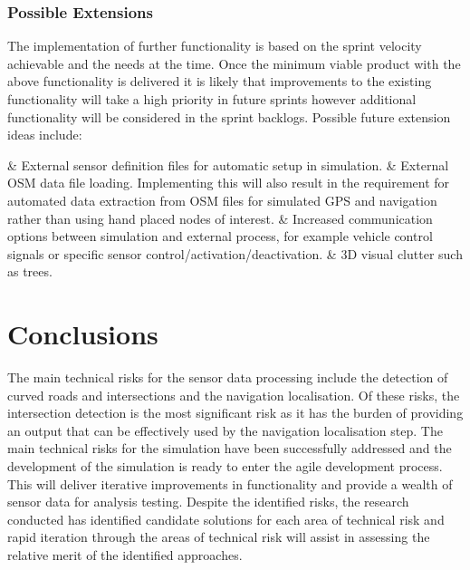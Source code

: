 \documentclass[]{aiaa-tc}%
\begin{document}
\subsubsection{Possible Extensions}

The implementation of further functionality is based on the sprint velocity achievable and the needs at the time. Once the minimum viable product with the above functionality is delivered it is likely that improvements to the existing functionality will take a high priority in future sprints however additional functionality will be considered in the sprint backlogs. Possible future extension ideas include:
\begin{easylist}[itemize]
	& External sensor definition files for automatic setup in simulation.
	& External OSM data file loading. Implementing this will also result in the requirement for automated data extraction from OSM files for simulated GPS and navigation rather than using hand placed nodes of interest.
	& Increased communication options between simulation and external process, for example vehicle control signals or specific sensor control/activation/deactivation.
	& 3D visual clutter such as trees.
\end{easylist}

\section{Conclusions}

The main technical risks for the sensor data processing include the detection of curved roads and intersections and the navigation localisation. Of these risks, the intersection detection is the most significant risk as it has the burden of providing an output that can be effectively used by the navigation localisation step. The main technical risks for the simulation have been successfully addressed and the development of the simulation is ready to enter the agile development process. This will deliver iterative improvements in functionality and provide a wealth of sensor data for analysis testing. Despite the identified risks, the research conducted has identified candidate solutions for each area of technical risk and rapid iteration through the areas of technical risk will assist in assessing the relative merit of the identified approaches.
\end{document}

